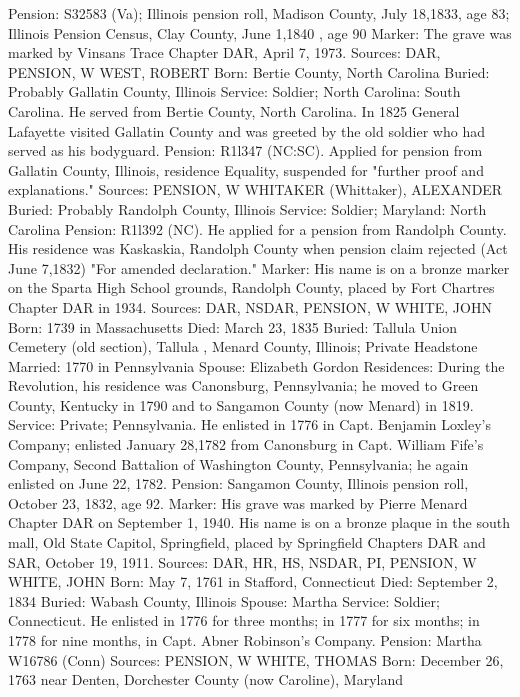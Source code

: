 Pension: S32583 (Va); Illinois pension roll, Madison County, July 18,1833, age 83; Illinois Pension Census, Clay County, June 1,1840 , age 90
Marker:   The grave was marked by Vinsans Trace Chapter DAR, April 7, 1973. 
Sources: DAR, PENSION, W 
WEST, ROBERT 
Born: Bertie County, North Carolina 
Buried: Probably Gallatin County, Illinois
Service: Soldier; North Carolina: South Carolina. He served from Bertie County, North Carolina. In 1825 General Lafayette visited Gallatin County and was greeted by the old soldier who had served as his bodyguard. 
Pension: R1l347 (NC:SC). Applied for pension from Gallatin County, Illinois, residence Equality, suspended for "further proof and explanations." 
Sources: PENSION, W 
WHITAKER (Whittaker), ALEXANDER 
Buried: Probably Randolph County, Illinois
Service: Soldier; Maryland: North Carolina Pension: R1l392 (NC). He applied for a pension from Randolph County. His residence was Kaskaskia, Randolph County when pension claim rejected (Act June 7,1832) "For amended declaration."
Marker: His name is on a bronze marker on the Sparta High School grounds, Randolph County, placed by Fort Chartres Chapter DAR in 1934. 
Sources: DAR, NSDAR, PENSION, W 
WHITE, JOHN 
Born: 1739 in Massachusetts
Died: March 23, 1835 
Buried: Tallula Union Cemetery (old section), Tallula , Menard County, Illinois; Private Headstone 
Married: 1770 in Pennsylvania 
Spouse: Elizabeth Gordon 
Residences: During the Revolution, his residence was Canonsburg, Pennsylvania; he moved to Green County, Kentucky in 1790 and to Sangamon County (now Menard) in 1819. 
Service: Private; Pennsylvania. He enlisted in 1776 in Capt. Benjamin Loxley's Company; enlisted January 28,1782 from Canonsburg in Capt. William Fife's Company, Second Battalion of Washington County, Pennsylvania; he again enlisted on June 22, 1782. 
Pension: Sangamon County, Illinois pension roll, October 23, 1832, age 92.
Marker: His grave was marked by Pierre Menard Chapter DAR on September 1, 1940. His name is on a bronze plaque in the south mall, Old State Capitol, Springfield, placed by Springfield Chapters DAR and SAR, October 19, 1911. 
Sources: DAR, HR, HS, NSDAR, PI, PENSION, W 
WHITE, JOHN 
Born: May 7, 1761 in Stafford, Connecticut 
Died: September 2, 1834 
Buried: Wabash County, Illinois 
Spouse: Martha 
Service: Soldier; Connecticut. He enlisted in 1776 for three months; in 1777 for six months; in 1778 for nine months, in Capt. Abner Robinson's Company. 
Pension: Martha W16786 (Conn) 
Sources: PENSION, W 
WHITE, THOMAS 
Born: December 26, 1763 near Denten, Dorchester County (now Caroline), Mary­land

